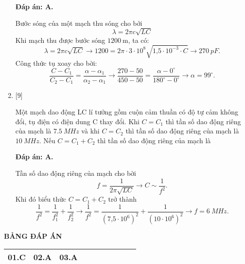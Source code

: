 \begin{enumerate}[label=\bfseries Câu \arabic*:]
	\loigiai
	{		\textbf{Đáp án: A.}
		
Bước sóng của một mạch thu sóng cho bởi
$$
\lambda=2 \pi c \sqrt{L C}
$$
Khi mạch thu được bước sóng $1200 \mathrm{~m}$, ta có:
$$
\lambda=2 \pi c \sqrt{L C} \rightarrow 1200=2 \pi \cdot 3\cdot10^{8} \sqrt{\text{1,5}\cdot10^{-3} \cdot C} \rightarrow \SI{270}{pF}.
$$
Công thức tụ xoay cho bời:
$$
\dfrac{C-C_{1}}{C_{2}-C_{1}}=\dfrac{\alpha-\alpha_{1}}{\alpha_{2}-\alpha_{1}} \rightarrow \dfrac{270-50}{450-50}=\dfrac{\alpha-0^{\circ}}{180^{\circ}-0^{\circ}} \rightarrow \alpha=99^{\circ}.
$$
		
	}


	\item {} [9] 
	
	\cauhoi
	{Một mạch dao động LC lí tưởng gồm cuộn cảm thuần có độ tự cảm không đổi, tụ điện có điện dung C thay đổi. Khi $C = C_1$ thì tần số dao động riêng của mạch là $\SI{7,5}{MHz}$ và khi $C = C_2$ thì tần số dao động riêng của mạch là $\SI{10}{MHz}$. Nếu $C = C_1 + C_2$ thì tần số dao động riêng của mạch là
	}
	
	\loigiai
	{		\textbf{Đáp án: A.}
		
Tần số dao động riêng của mạch cho bời
$$
f=\dfrac{1}{2 \pi \sqrt{L C}} \rightarrow C \sim \dfrac{1}{f^{2}}.
$$
Khi đó biểu thức $C=C_{1}+C_{2}$ trở thành
$$
\dfrac{1}{f^{2}}=\dfrac{1}{f_{1}^{2}}+\dfrac{1}{f_{2}^{2}} \rightarrow \dfrac{1}{f^{2}}=\dfrac{1}{\left(\text{7,5}\cdot10^{6}\right)^{2}}+\dfrac{1}{\left(10\cdot10^{6}\right)^{2}} \rightarrow f = \SI{6}{MHz}.
$$
	
	}

\end{enumerate}

\loigiai
{
	\begin{center}
		\textbf{BẢNG ĐÁP ÁN}
	\end{center}
	\begin{center}
		\begin{tabular}{|m{2.8em}|m{2.8em}|m{2.8em}|m{2.8em}|m{2.8em}|m{2.8em}|m{2.8em}|m{2.8em}|m{2.8em}|m{2.8em}|}
			\hline
			01.C  & 02.A  & 03.A  &   &   &   &  &  &  &  \\
			\hline
			
		\end{tabular}
	\end{center}
}

\whiteBGstarEnd